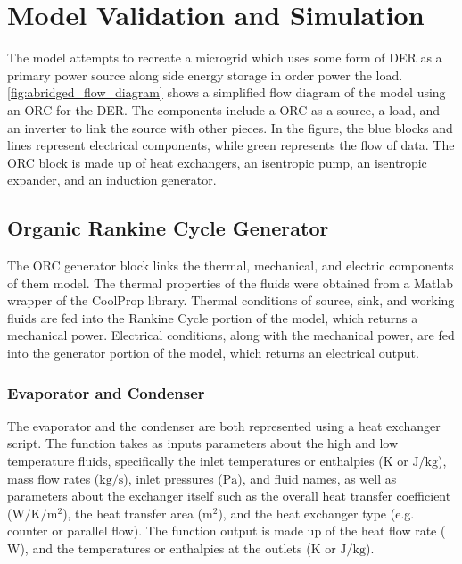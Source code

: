 \chapter{Model Validation and Simulation}
\label{ch:model}

The model attempts to recreate a microgrid which uses some form of DER as a primary power source along side energy storage in order power the load. \autoref{fig:abridged_flow_diagram} shows a simplified flow diagram of the model using an ORC for the DER. The components include a ORC as a source, a load, and an inverter to link the source with other pieces. In the figure, the blue blocks and lines represent electrical components, while green represents the flow of data. The ORC block is made up of heat exchangers, an isentropic pump, an isentropic expander, and an induction generator. 
\begin{comment}
The load block \verb|one line description of load|. 
The energy storage block \verb|one line description of energy storage|. 
The inverter block \verb|one line description of inverter|.
\end{comment}


\section{Organic Rankine Cycle Generator}
The ORC generator block links the thermal, mechanical, and electric components of them model. The thermal properties of the fluids were obtained from a Matlab wrapper of the CoolProp library. \cite{Bell2014} Thermal conditions of source, sink, and working fluids are fed into the Rankine Cycle portion of the model, which returns a mechanical power. Electrical conditions, along with the mechanical power, are fed into the generator portion of the model, which returns an electrical output.  

\subsection{Evaporator and Condenser}
The evaporator and the condenser are both represented using a heat exchanger script.  The function takes as inputs parameters about the high and low temperature fluids, specifically the inlet temperatures or enthalpies ($\si{\kelvin}$ or $\si{\joule\per\kilogram}$), mass flow rates ($\si{\kilogram\per\second} $), inlet pressures ($\si{\pascal}$), and fluid names, as well as parameters about the exchanger itself such as the overall heat transfer coefficient ($\si{\watt\per\kelvin\per\meter\squared}$), the heat transfer area ($\si{\meter\squared}$), and the heat exchanger type (e.g. counter or parallel flow). The function output is made up of the heat flow rate ($\si{\watt}$), and the temperatures or enthalpies at the outlets ($\si{\kelvin}$ or $\si{\joule\per\kilogram}$). 

